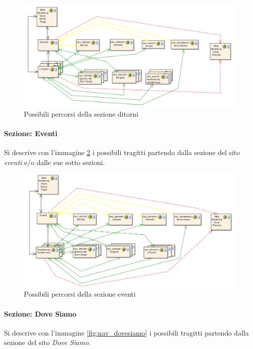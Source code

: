 \documentclass[a4paper,12pt,hidelinks]{report}
\begin{document}
\begin{figure}[h!]%
    \includegraphics[width=1.1\textwidth,keepaspectratio=true]{../../img/nav_dintorni}
    \centering
    \caption{Possibili percorsi della sezione ditorni}%
    \label{fig:nav_dintorni}%
\end{figure}

\newpage
\paragraph{Sezione: Eventi}
Si descrive con l'immagine \ref{fig:nav_eventi} i possibili tragitti partendo dalla sezione del sito \textit{eventi} e/o dalle sue sotto sezioni.

\begin{figure}[h!]%
    \includegraphics[width=1.1\textwidth,keepaspectratio=true]{../../img/nav_eventi}
    \centering
    \caption{Possibili percorsi della sezione eventi}%
    \label{fig:nav_eventi}%
\end{figure}

\newpage
\paragraph{Sezione: Dove Siamo}
Si descrive con l'immagine \ref{fig:nav_dovesiamo} i possibili tragitti partendo dalla sezione del sito \textit{Dove Siamo}.
\end{document}
